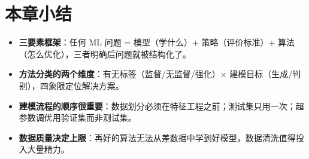 \documentclass[a4paper,11pt]{ctexart}
\begin{document}
\section{本章小结}
\begin{itemize}
    \item \textbf{三要素框架}：任何 ML 问题 = 模型（学什么）+ 策略（评价标准）+ 算法（怎么优化），三者明确后问题就被结构化了。
    \item \textbf{方法分类的两个维度}：有无标签（监督/无监督/强化）× 建模目标（生成/判别），四象限定位解决方案。
    \item \textbf{建模流程的顺序很重要}：数据划分必须在特征工程之前；测试集只用一次；超参数调优用验证集而非测试集。
    \item \textbf{数据质量决定上限}：再好的算法无法从差数据中学到好模型，数据清洗值得投入大量精力。
\end{itemize}
\end{document}
